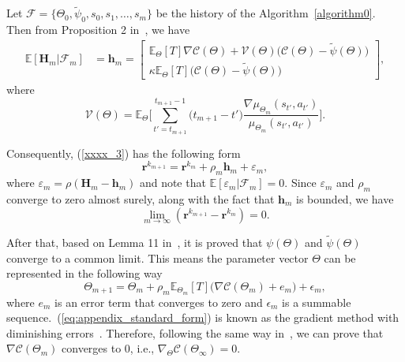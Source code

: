 \documentclass[twocolumn,10pt]{IEEEtran}
\begin{document}
Let $\mathscr{F} = \{ \Theta_0, \widetilde{\psi}_{0}, s_0,s_1,\ldots,s_m  \}$ be the history of the Algorithm~\ref{algorithm0}. Then from Proposition 2 in~\cite{Marbach2001}, we have
\begin{equation}
\begin{aligned}
\mathbb{E}[\mathbf{H}_m|\mathscr{F}_m]	& \!=\! \mathbf{h}_m	\!=\! \left[	\begin{array}{c}
\mathbb{E}_{\Theta}[T] \nabla \mathcal{C} (\Theta) + \mathscr{V}(\Theta) \big( \mathcal{C} (\Theta) - \widetilde{\psi}(\Theta) \big)	\\
\kappa \mathbb{E}_{\Theta}[T] \big( \mathcal{C} (\Theta) - \widetilde{\psi}(\Theta)	\big)
\end{array}	\right],
\end{aligned}
\end{equation}
where 
\begin{displaymath}
\mathscr{V}(\Theta)=\mathbb{E}_{\Theta}\Bigg[ \sum_{t'=t_{m+1}}^{t_{m+1}-1} \big( t_{m+1} - t'\big) \frac{\nabla \mu_{\Theta_{m}}(s_{t'},a_{t'})}{\mu_{\Theta_{m}}(s_{t'},a_{t'})} \Bigg].
\end{displaymath}


Consequently, (\ref{xxxx_3}) has the following form
\begin{equation}
\mathbf{r}^{k_{m+1}} = \mathbf{r}^{k_m} + \rho_{m} \mathbf{h}_m + \varepsilon_m,
\end{equation}
where $\varepsilon_m = \rho (\mathbf{H}_m - \mathbf{h}_m)$ and note that $\mathbb{E}[\varepsilon_m|\mathscr{F}_m]=0$. Since $\varepsilon_m$ and $\rho_m$ converge to zero almost surely, along with the fact that $\mathbf{h}_{m}$ is bounded, we have
\begin{equation}
\lim_{m \rightarrow \infty} (\mathbf{r}^{k_{m+1}}-\mathbf{r}^{k_{m}}) = 0.
\end{equation}

After that, based on Lemma 11 in~\cite{Marbach2001}, it is proved that $\psi(\Theta)$ and $\widetilde{\psi}(\Theta)$ converge to a common limit. This means the parameter vector $\Theta$ can be represented in the following way
\begin{equation}
\label{eq:appendix_standard_form}
\Theta_{m+1} = \Theta_{m} + \rho_m \mathbb{E}_{\Theta_m}[T] \big(\nabla \mathcal{C} (\Theta_m) + e_m \big) + \epsilon_m,
\end{equation}
where $e_m$ is an error term that converges to zero and $\epsilon_m$ is a summable sequence.~(\ref{eq:appendix_standard_form}) is known as the gradient method with diminishing errors~\cite{Bertsekas1999,Borkar2008}. Therefore, following the same way in~\cite{Bertsekas1999,Borkar2008}, we can prove that $\nabla \mathcal{C} (\Theta_m)$ converges to $0$, i.e., $\nabla_{\Theta} \mathcal{C} (\Theta_{\infty})=0$. 
\end{document}
